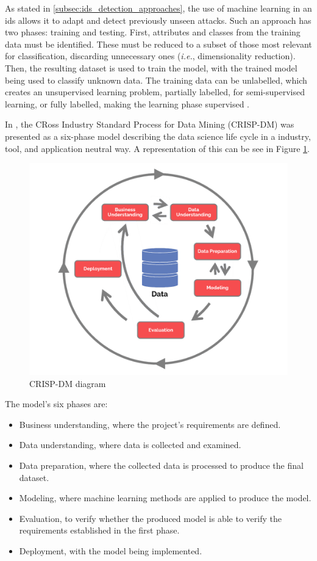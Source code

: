 As stated in \ref{subsec:ids_detection_approaches}, the use of machine learning in an \gls{ids} allows it to adapt and detect previously unseen attacks. Such an approach has two phases: training and testing. First, attributes and classes from the training data must be identified. These must be reduced to a subset of those most relevant for classification, discarding unnecessary ones (\textit{i.e.}, dimensionality reduction). Then, the resulting dataset is used to train the model, with the trained model being used to classify unknown data. The training data can be unlabelled, which creates an unsupervised learning problem, partially labelled, for semi-supervised learning, or fully labelled, making the learning phase supervised \citep{Buczak2016}.\par
In \citep{Shearer2000}, the CRoss Industry Standard Process for Data Mining (CRISP-DM) was presented as a six-phase model describing the data science life cycle in a industry, tool, and application neutral way. A representation of this can be see in Figure \ref{fig:CRISP-DM}.

\begin{figure}
    \centering
    \includegraphics[width = .7\textwidth]{img/parts/introduction/CRISP-DM.png}
    \caption{CRISP-DM diagram \citep{DSPA}}
    \label{fig:CRISP-DM}
\end{figure}

The model's six phases are:
\begin{itemize}
    \item Business understanding, where the project's requirements are defined.
    \item Data understanding, where data is collected and examined.
    \item Data preparation, where the collected data is processed to produce the final dataset.
    \item Modeling, where machine learning methods are applied to produce the model.
    \item Evaluation, to verify whether the produced model is able to verify the requirements established in the first phase.
    \item Deployment, with the model being implemented.
\end{itemize}

